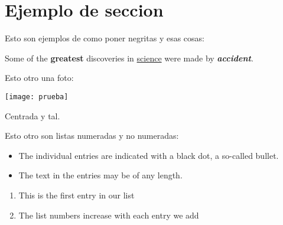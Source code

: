 \section{Ejemplo de seccion}

Esto son ejemplos de como poner negritas y esas cosas:

Some of the \textbf{greatest}
discoveries in \underline{science} 
were made by \textbf{\textit{accident}}.

Esto otro una foto:

{\centering\texttt{[image: prueba]}}


Centrada y tal.

Esto otro son listas numeradas y no numeradas:

\begin{itemize}
  \item The individual entries are indicated with a black dot, a so-called bullet.
  \item The text in the entries may be of any length.
\end{itemize}

\begin{enumerate}
  \item This is the first entry in our list
  \item The list numbers increase with each entry we add
\end{enumerate}
\pagebreak
